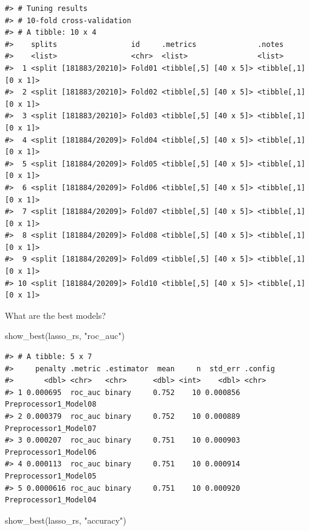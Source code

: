 \documentclass[
]{krantz}
\makeatletter
\newenvironment{Shaded}{\begin{snugshade}}{\end{snugshade}}
\newcommand{\FunctionTok}[1]{\textcolor[rgb]{0.00,0.00,0.00}{#1}}
\newcommand{\NormalTok}[1]{#1}
\newcommand{\StringTok}[1]{\textcolor[rgb]{0.31,0.60,0.02}{#1}}
\newenvironment{kframe}{%
\medskip{}
\setlength{\fboxsep}{.8em}
 \def\at@end@of@kframe{}%
 \ifinner\ifhmode%
  \def\at@end@of@kframe{\end{minipage}}%
  \begin{minipage}{\columnwidth}%
 \fi\fi%
 \def\FrameCommand##1{\hskip\@totalleftmargin \hskip-\fboxsep
 \colorbox{shadecolor}{##1}\hskip-\fboxsep
     \hskip-\linewidth \hskip-\@totalleftmargin \hskip\columnwidth}%
 \MakeFramed {\advance\hsize-\width
   \@totalleftmargin\z@ \linewidth\hsize
   \@setminipage}}%
 {\par\unskip\endMakeFramed%
 \at@end@of@kframe}
\renewenvironment{Shaded}{\begin{kframe}}{\end{kframe}}
\makeatother
\begin{document}
\begin{verbatim}
#> # Tuning results
#> # 10-fold cross-validation 
#> # A tibble: 10 x 4
#>    splits                 id     .metrics              .notes              
#>    <list>                 <chr>  <list>                <list>              
#>  1 <split [181883/20210]> Fold01 <tibble[,5] [40 x 5]> <tibble[,1] [0 x 1]>
#>  2 <split [181883/20210]> Fold02 <tibble[,5] [40 x 5]> <tibble[,1] [0 x 1]>
#>  3 <split [181883/20210]> Fold03 <tibble[,5] [40 x 5]> <tibble[,1] [0 x 1]>
#>  4 <split [181884/20209]> Fold04 <tibble[,5] [40 x 5]> <tibble[,1] [0 x 1]>
#>  5 <split [181884/20209]> Fold05 <tibble[,5] [40 x 5]> <tibble[,1] [0 x 1]>
#>  6 <split [181884/20209]> Fold06 <tibble[,5] [40 x 5]> <tibble[,1] [0 x 1]>
#>  7 <split [181884/20209]> Fold07 <tibble[,5] [40 x 5]> <tibble[,1] [0 x 1]>
#>  8 <split [181884/20209]> Fold08 <tibble[,5] [40 x 5]> <tibble[,1] [0 x 1]>
#>  9 <split [181884/20209]> Fold09 <tibble[,5] [40 x 5]> <tibble[,1] [0 x 1]>
#> 10 <split [181884/20209]> Fold10 <tibble[,5] [40 x 5]> <tibble[,1] [0 x 1]>
\end{verbatim}

What are the best models?

\begin{Shaded}
\begin{Highlighting}[]
\FunctionTok{show\_best}\NormalTok{(lasso\_rs, }\StringTok{"roc\_auc"}\NormalTok{)}
\end{Highlighting}
\end{Shaded}

\begin{verbatim}
#> # A tibble: 5 x 7
#>     penalty .metric .estimator  mean     n  std_err .config              
#>       <dbl> <chr>   <chr>      <dbl> <int>    <dbl> <chr>                
#> 1 0.000695  roc_auc binary     0.752    10 0.000856 Preprocessor1_Model08
#> 2 0.000379  roc_auc binary     0.752    10 0.000889 Preprocessor1_Model07
#> 3 0.000207  roc_auc binary     0.751    10 0.000903 Preprocessor1_Model06
#> 4 0.000113  roc_auc binary     0.751    10 0.000914 Preprocessor1_Model05
#> 5 0.0000616 roc_auc binary     0.751    10 0.000920 Preprocessor1_Model04
\end{verbatim}

\begin{Shaded}
\begin{Highlighting}[]
\FunctionTok{show\_best}\NormalTok{(lasso\_rs, }\StringTok{"accuracy"}\NormalTok{)}
\end{Highlighting}
\end{Shaded}
\end{document}
